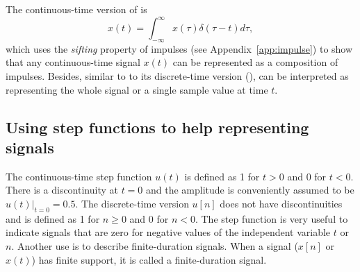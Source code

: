 



The continuous-time version of  is 
\begin{equation}
x(t) = \int_{-\infty}^\infty {x(\tau) \delta(\tau-t)} d\tau,
\label{eq:impulses_ct}
\end{equation}
which uses the \emph{sifting} property of impulses (see Appendix~\ref{app:impulse}) to
show that any continuous-time signal $x(t)$ can be represented as a composition of impulses. 
Besides, similar to
to its discrete-time version (),  can be interpreted as representing the whole signal or 
a single sample value at time $t$.



\subsection{Using step functions to help representing signals}
\label{sec:step_function}
The continuous-time step function $u(t)$ is defined as 1 for $t>0$ and 0 for $t<0$. There is a discontinuity at $t=0$ and the amplitude is conveniently assumed to be $u(t)|_{t=0}=0.5$. The discrete-time version $u[n]$ does not have discontinuities and is defined as 1 for $n \ge 0$ and 0 for $n<0$. The step function is very useful to indicate signals that are zero for negative values of the independent variable $t$ or $n$. Another use is to describe finite-duration signals. 
When a signal ($x[n]$ or $x(t)$) has finite support, it is called a finite-duration signal.

